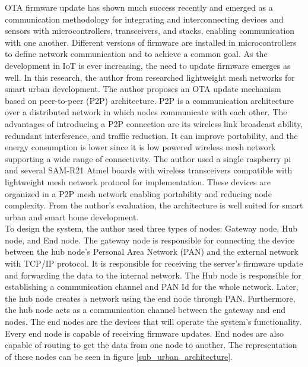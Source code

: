 \documentclass[12pt,a4paper]{article}
\begin{document}
{OTA firmware update has shown much success recently and emerged as a communication methodology for integrating and interconnecting devices and sensors with microcontrollers, transceivers, and stacks, enabling communication with one another. Different versions of firmware are installed in microcontrollers to define network communication and to achieve a common goal. As the development in IoT is ever increasing, the need to update firmware emerges as well. In this research, the author from \cite{r30} researched lightweight mesh networks for smart urban development. The author proposes an OTA update mechanism based on peer-to-peer (P2P) architecture. P2P is a communication architecture over a distributed network in which nodes communicate with each other. The advantages of introducing a P2P connection are its wireless link broadcast ability, redundant interference, and traffic reduction. It can improve portability, and the energy consumption is lower since it is low powered wireless mesh network supporting a wide range of connectivity. The author used a single raspberry pi and several SAM-R21 Atmel boards with wireless transceivers compatible with lightweight mesh network protocol for implementation. These devices are organized in a P2P mesh network enabling portability and reducing node complexity. From the author's evaluation, the architecture is well suited for smart urban and smart home development. \cite{r30} \\

To design the system, the author used three types of nodes: Gateway node, Hub node, and End node. The gateway node is responsible for connecting the device between the hub node's Personal Area Network (PAN) and the external network with TCP/IP protocol. It is responsible for receiving the server's firmware update and forwarding the data to the internal network. The Hub node is responsible for establishing a communication channel and PAN Id for the whole network. Later, the hub node creates a network using the end node through PAN. Furthermore, the hub node acts as a communication channel between the gateway and end nodes. The end nodes are the devices that will operate the system's functionality. Every end node is capable of receiving firmware updates. End nodes are also capable of routing to get the data from one node to another. The representation of these nodes can be seen in figure \ref{sub_urban_architecture}. \cite{r30} \\

}
\end{document}
